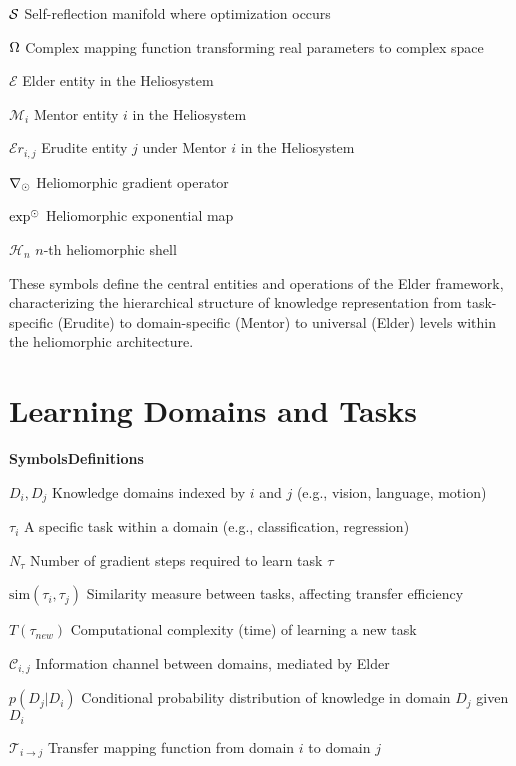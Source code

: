 \begin{multicols}{2}
\noindent$\mathcal{S}$ \dotfill Self-reflection manifold where optimization occurs

\noindent$\Omega$ \dotfill Complex mapping function transforming real parameters to complex space

\noindent$\mathcal{E}$ \dotfill Elder entity in the Heliosystem

\noindent$\mathcal{M}_i$ \dotfill Mentor entity $i$ in the Heliosystem

\noindent$\mathcal{E}r_{i,j}$ \dotfill Erudite entity $j$ under Mentor $i$ in the Heliosystem

\noindent$\nabla_{\odot}$ \dotfill Heliomorphic gradient operator

\noindent$\exp^{\odot}$ \dotfill Heliomorphic exponential map

\noindent$\mathcal{H}_n$ \dotfill $n$-th heliomorphic shell
\end{multicols}

\vspace{1cm}
\begin{center}
These symbols define the central entities and operations of the Elder framework, characterizing the hierarchical structure of knowledge representation from task-specific (Erudite) to domain-specific (Mentor) to universal (Elder) levels within the heliomorphic architecture.
\end{center}

\clearpage
\chapter*{Learning Domains and Tasks}

\begin{multicols}{2}
\noindent\textbf{\large Symbols}\hfill\textbf{\large Definitions}

\vspace{0.3cm}
\noindent$D_i, D_j$ \dotfill Knowledge domains indexed by $i$ and $j$ (e.g., vision, language, motion)

\noindent$\tau_i$ \dotfill A specific task within a domain (e.g., classification, regression)

\noindent$N_{\tau}$ \dotfill Number of gradient steps required to learn task $\tau$

\noindent$\text{sim}(\tau_i, \tau_j)$ \dotfill Similarity measure between tasks, affecting transfer efficiency

\noindent$T(\tau_{new})$ \dotfill Computational complexity (time) of learning a new task

\noindent$\mathcal{C}_{i,j}$ \dotfill Information channel between domains, mediated by Elder

\noindent$p(D_j|D_i)$ \dotfill Conditional probability distribution of knowledge in domain $D_j$ given $D_i$

\noindent$\mathcal{T}_{i \to j}$ \dotfill Transfer mapping function from domain $i$ to domain $j$
\end{multicols}

